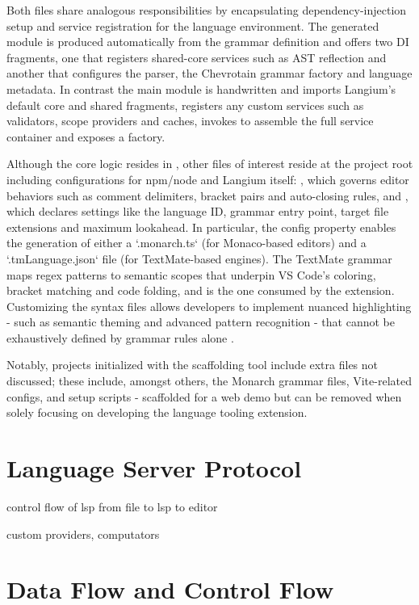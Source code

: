 Both  files share analogous responsibilities by encapsulating dependency-injection setup and service registration for the language environment.
The generated module is produced automatically from the grammar definition and offers two DI fragments, one that registers shared-core services such as AST
reflection and another that configures the parser, the Chevrotain grammar factory and language metadata. In contrast the main module is handwritten and imports
Langium's default core and shared fragments, registers any custom services such as validators, scope providers and caches, invokes  to assemble the full
service container and exposes a  factory.

Although the core logic resides in , other files of interest reside at the project root including configurations for npm/node and Langium itself:
, which governs editor behaviors such as comment delimiters, bracket pairs and auto-closing rules, and
, which declares settings like the language ID, grammar entry point, target file extensions and maximum lookahead.
In particular, the  config property enables the generation of either a `.monarch.ts` (for Monaco-based editors) and a `.tmLanguage.json` file (for TextMate-based engines).
The TextMate grammar maps regex patterns to semantic scopes that underpin VS Code's coloring, bracket
matching and code folding, and is the one consumed by the extension. Customizing the syntax files allows developers to implement nuanced highlighting
- such as semantic theming and advanced pattern recognition - that cannot be exhaustively defined by grammar rules alone \cite{EDKarlsson2022Discussion604}.

Notably, projects initialized with the scaffolding tool include extra files not discussed; these include, amongst others, the Monarch grammar files, Vite-related configs,
and setup scripts - scaffolded for a web demo but can be removed when solely focusing on developing the language tooling extension.

\section{Language Server Protocol}
control flow of lsp from file to lsp to editor

custom providers, computators

\section{Data Flow and Control Flow}


